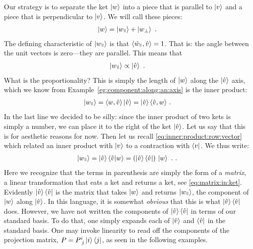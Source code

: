 \documentclass[12pt]{article}
\begin{document}
Our strategy is to separate the ket $\left|w\right\rangle$ into a piece that is parallel to $\left|v\right\rangle$ and a piece that is perpendicular to $\left|v\right\rangle$. We will call these pieces:
\begin{align}
    \ket{w}= \ket{w_\paral} + \ket{w_\perp} \ .
\end{align}
The defining characteristic of $\ket{w_\paral}$ is that $\la \hat{w}_\paral, \hat{v}\ra = 1$. That is: the angle between the unit vectors is zero---they are parallel. This means that 
\begin{align}
    \ket{w_\paral} \propto \ket{\hat{v}} \ .
\end{align}
What is the proportionality? This is simply the length of $\left|w\right\rangle$ along the $\left|\hat{v}\right\rangle$ axis, which we know from Example~\ref{eg:component:along:an:axis} is the inner product:
\begin{align}
    \ket{w_\paral} = \la w, \hat{v} \ra \ket{\hat{v}} =  \ket{\hat{v}}\la \hat{v}, w \ra  \ .
\end{align}
In the last line we decided to be silly: since the inner product of two kets is simply a number, we can place it to the right of the ket $\left|\hat{v}\right\rangle$. Let us say that this is for aesthetic reasons for now. Then let us recall \eqref{eq:inner:product:row:vector} which related an inner product with $\left|v\right\rangle$ to a contraction with $\left\langle v\right|$. We thus write:
\begin{align}
    \ket{w_\paral} = \ket{\hat{v}} \la{\hat{v}} | w \ra  =
    \left(\ket{\hat{v}} \bra{\hat{v}} \right)  \, \ket{w} \ .
     \ .
\end{align}
Here we recognize that the terms in parenthesis are simply the form of a \emph{matrix}, a linear transformation that eats a ket and returns a ket, see \eqref{eq:matrix:in:ket}. Evidently $\left|\hat{v}\right\rangle \left\langle\hat{v}\right|$ is the matrix that takes $\left|w\right\rangle$ and returns $\ket{w_\paral}$, the component of $\left|w\right\rangle$ along $\left|\hat{v}\right\rangle$. In this language, it is somewhat \emph{obvious} that this is what $\left|\hat{v}\right\rangle \left\langle\hat{v}\right|$ does. However, we have not written the components of $\left|\hat{v}\right\rangle \left\langle\hat{v}\right|$ in terms of our standard basis. To do that, one simply expands each  of $\left|\hat{v}\right\rangle$ and $\left\langle\hat{v}\right|$ in the standard basis. One may invoke linearity to read off the components of the projection matrix, $P = P\aij{i}{j}\ket{i}\bra{j}$, as seen in the following examples. 
\end{document}
